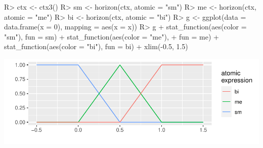 \begin{Schunk}
\begin{Sinput}
R> ctx <- ctx3()
R> sm <- horizon(ctx, atomic = "sm")
R> me <- horizon(ctx, atomic = "me")
R> bi <- horizon(ctx, atomic = "bi")
R> g <- ggplot(data = data.frame(x = 0), mapping = aes(x = x))
R> g + stat_function(aes(color = "sm"), fun = sm) + stat_function(aes(color = "me"), 
+     fun = me) + stat_function(aes(color = "bi"), fun = bi) + xlim(-0.5, 1.5)
\end{Sinput}

\includegraphics[width=\maxwidth]{figure/unnamed-chunk-12-1} %
\end{Schunk}
